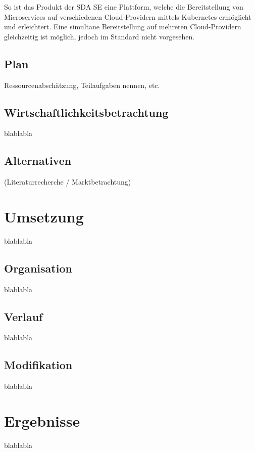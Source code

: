 So ist das Produkt der SDA SE eine Plattform, welche die Bereitstellung von Microservices auf verschiedenen Cloud-Providern mittels Kubernetes ermöglicht und erleichtert.
Eine simultane Bereitstellung auf mehreren Cloud-Providern gleichzeitig ist möglich, jedoch im Standard nicht vorgesehen.

\subsection{Plan}
\label{subsec:description:plan}
Ressourcenabschätzung, Teilaufgaben nennen, etc.

\subsection{Wirtschaftlichkeitsbetrachtung}
\label{subsec:description:wirtschaftlichkeitsbetrachtung}
blablabla

\subsection{Alternativen}
\label{subsec:description:alternativen}
(Literaturrecherche / Marktbetrachtung)

\section{Umsetzung}
\label{sec:description:umsetzung}
blablabla

\subsection{Organisation}
\label{subsec:description:Organisation}
blablabla

\subsection{Verlauf}
\label{subsec:description:verlauf}
blablabla

\subsection{Modifikation}
\label{subsec:description:modifikation}
blablabla

\section{Ergebnisse}
\label{sec:description:ergebnisse}
blablabla

